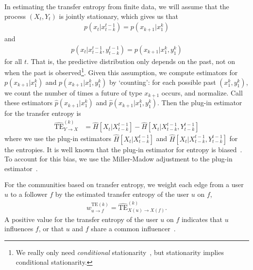 In estimating the transfer entropy from finite data, we will assume that the process $(X_{t}, Y_{t})$ is jointly stationary, which gives us that
\begin{align}
	p(x_{t} | x_{t-k}^{t-1}) = p(x_{k+1} | x_{1}^{k})
\end{align}
and
\begin{align}
	p(x_{t} | x_{t-k}^{t-1}, y_{t-k}^{t-1}) = p(x_{k+1} | x_{1}^{k}, y_{1}^{k})
\end{align}
for all $t$. That is, the predictive distribution only depends on the past, not on when the past is observed\footnote{We really only need \emph{conditional} stationarity~\cite{caires2003nonparametric}, but stationarity implies conditional stationarity.}. Given this assumption, we compute estimators for $p(x_{k+1} | x_{1}^{k})$ and $p(x_{k+1} | x_{1}^{k}, y_{1}^{k})$ by `counting': for each possible past $(x_{1}^{k}, y_{1}^{k})$, we count the number of times a future of type $x_{k+1}$ occurs, and normalize. Call these estimators $\hat{p}(x_{k+1} | x_{1}^{k})$ and $\hat{p}(x_{k+1} | x_{1}^{k}, y_{1}^{k})$. Then the plug-in estimator for the transfer entropy is
\begin{align}
	\widehat{\text{TE}}_{Y \to X}^{(k)} &= \hat{H}\left[X_{t} | X_{t-k}^{t-1}\right] - \hat{H}\left[X_{t} | X_{t-k}^{t-1}, Y_{t-k}^{t-1}\right]
\end{align}
where we use the plug-in estimators $\hat{H}\left[X_{t} | X_{t-k}^{t-1}\right]$ and $\hat{H}\left[X_{t} | X_{t-k}^{t-1}, Y_{t-k}^{t-1}\right]$ for the entropies. It is well known that the plug-in estimator for entropy is biased~\cite{paninski2003estimation}. To account for this bias, we use the Miller-Madow adjustment to the plug-in estimator~\cite{miller1955note}.

For the communities based on transfer entropy, we weight each edge from a user $u$ to a follower $f$ by the estimated transfer entropy of the user $u$ on $f$, 
\begin{align}
	w_{u \to f}^{\text{TE}(k)} = \widehat{\text{TE}}_{X(u) \to X(f)}^{(k)}. \label{Eqn-EW-activity}
\end{align}
A positive value for the transfer entropy of the user $u$ on $f$ indicates that $u$ influences $f$, or that $u$ and $f$ share a common influencer~\cite{ver2012information}.


